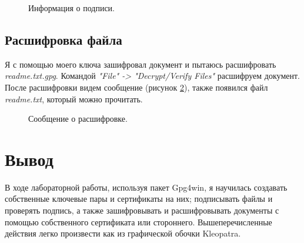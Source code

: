 \documentclass[10pt,a4paper]{report}
\begin{document}
		\begin{figure}[h]
			\caption{Информация о подписи.}
			\label{Img:12}
		\end{figure}
	
	\subsection{Расшифровка файла}	
	Я с помощью моего ключа зашифровал документ и пытаюсь расшифровать \textit{readme.txt.gpg}. Командой \textit{"File" -> "Decrypt/Verify Files"} расшифруем документ. После расшифровки видем сообщение (рисунок \ref{Img:13}), также появился файл \textit{readme.txt}, который можно прочитать. 
	
		\begin{figure}[h]
			\caption{Сообщение о расшифровке.}
			\label{Img:13}
		\end{figure}
	
	\section{Вывод}
	В ходе лабораторной работы, используя пакет Gpg4win, я научилась создавать собственные ключевые пары и сертификаты на них; подписывать файлы и проверять подпись, а также зашифровывать и расшифровывать документы с помощью собственного сертификата или стороннего. Вышеперечисленные действия легко произвести как из графической обочки Kleopatra.
	
\end{document}
